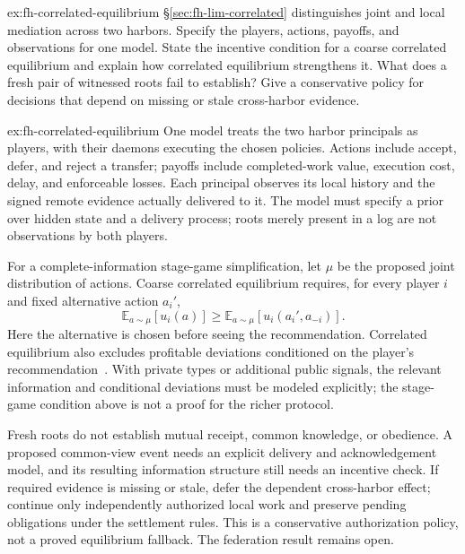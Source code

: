 \documentclass[11pt,a4paper]{article}
\theoremstyle{definition}
\theoremstyle{remark}
\begin{document}
\begin{pdexercise}[kind=Open,rating=3]{ex:fh-correlated-equilibrium}
\S\ref{sec:fh-lim-correlated} distinguishes joint and local mediation across two harbors. Specify the players, actions, payoffs, and observations for one model. State the incentive condition for a coarse correlated equilibrium and explain how correlated equilibrium strengthens it. What does a fresh pair of witnessed roots fail to establish? Give a conservative policy for decisions that depend on missing or stale cross-harbor evidence.
\end{pdexercise}
\begin{pdsolution}{ex:fh-correlated-equilibrium}
One model treats the two harbor principals as players, with their daemons executing the chosen policies. Actions include accept, defer, and reject a transfer; payoffs include completed-work value, execution cost, delay, and enforceable losses. Each principal observes its local history and the signed remote evidence actually delivered to it. The model must specify a prior over hidden state and a delivery process; roots merely present in a log are not observations by both players.

For a complete-information stage-game simplification, let $\mu$ be the proposed joint distribution of actions. Coarse correlated equilibrium requires, for every player $i$ and fixed alternative action $a_i'$,
\[
  \mathbb{E}_{a\sim\mu}[u_i(a)]
  \ge
  \mathbb{E}_{a\sim\mu}[u_i(a_i',a_{-i})].
\]
Here the alternative is chosen before seeing the recommendation. Correlated equilibrium also excludes profitable deviations conditioned on the player's recommendation~. With private types or additional public signals, the relevant information and conditional deviations must be modeled explicitly; the stage-game condition above is not a proof for the richer protocol.

Fresh roots do not establish mutual receipt, common knowledge, or obedience. A proposed common-view event needs an explicit delivery and acknowledgement model, and its resulting information structure still needs an incentive check. If required evidence is missing or stale, defer the dependent cross-harbor effect; continue only independently authorized local work and preserve pending obligations under the settlement rules. This is a conservative authorization policy, not a proved equilibrium fallback. The federation result remains open.
\end{pdsolution}
\end{document}

